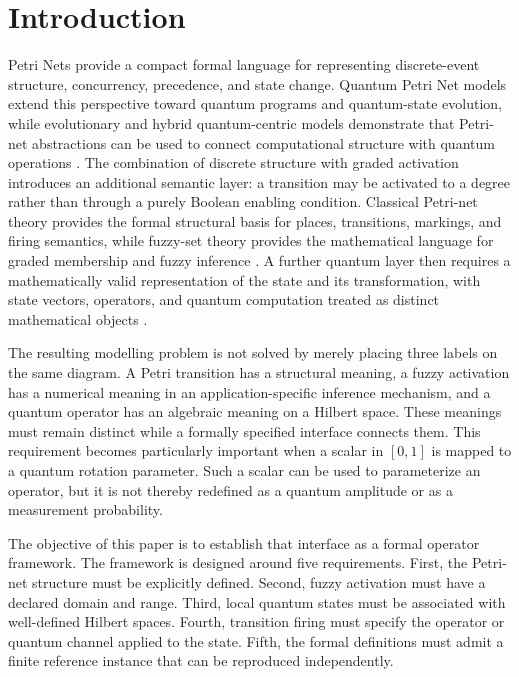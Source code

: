 \documentclass[final,3p,times]{elsarticle}
\begin{document}
\section{Introduction}

Petri Nets provide a compact formal language for representing discrete-event structure, concurrency, precedence, and state change. Quantum Petri Net models extend this perspective toward quantum programs and quantum-state evolution, while evolutionary and hybrid quantum-centric models demonstrate that Petri-net abstractions can be used to connect computational structure with quantum operations \cite{ref3,ref4,ref5}. The combination of discrete structure with graded activation introduces an additional semantic layer: a transition may be activated to a degree rather than through a purely Boolean enabling condition. Classical Petri-net theory provides the formal structural basis for places, transitions, markings, and firing semantics, while fuzzy-set theory provides the mathematical language for graded membership and fuzzy inference \cite{ref8,ref9,ref10,ref11,ref12,ref13}. A further quantum layer then requires a mathematically valid representation of the state and its transformation, with state vectors, operators, and quantum computation treated as distinct mathematical objects \cite{ref14,ref15}.

The resulting modelling problem is not solved by merely placing three labels on the same diagram. A Petri transition has a structural meaning, a fuzzy activation has a numerical meaning in an application-specific inference mechanism, and a quantum operator has an algebraic meaning on a Hilbert space. These meanings must remain distinct while a formally specified interface connects them. This requirement becomes particularly important when a scalar in $[0,1]$ is mapped to a quantum rotation parameter. Such a scalar can be used to parameterize an operator, but it is not thereby redefined as a quantum amplitude or as a measurement probability.

The objective of this paper is to establish that interface as a formal operator framework. The framework is designed around five requirements. First, the Petri-net structure must be explicitly defined. Second, fuzzy activation must have a declared domain and range. Third, local quantum states must be associated with well-defined Hilbert spaces. Fourth, transition firing must specify the operator or quantum channel applied to the state. Fifth, the formal definitions must admit a finite reference instance that can be reproduced independently.
\end{document}
